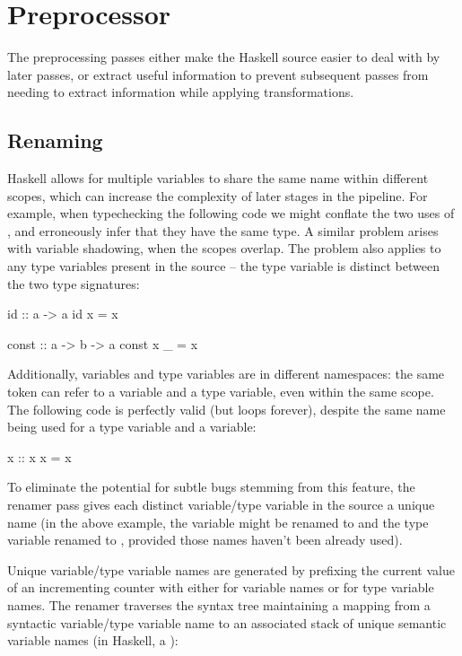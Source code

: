 \documentclass[dissertation.tex]{subfiles}
\begin{document}
\section{Preprocessor}
{

    The preprocessing passes either make the Haskell source easier to deal with by later passes, or extract useful information to prevent subsequent passes from needing to extract information while applying transformations.

    \subsection{Renaming}
    {

        Haskell allows for multiple variables to share the same name within different scopes, which can increase the complexity of later stages in the pipeline. For example, when typechecking the following code we might conflate the two uses of , and erroneously infer that they have the same type. A similar problem arises with variable shadowing, when the scopes overlap. The problem also applies to any type variables present in the source -- the type variable  is distinct between the two type signatures:

        \begin{haskellfigure}
        id :: a -> a
        id x = x

        const :: a -> b -> a
        const x _ = x
        \end{haskellfigure}

        Additionally, variables and type variables are in different namespaces: the same token can refer to a variable and a type variable, even within the same scope. The following code is perfectly valid (but loops forever), despite the same name being used for a type variable and a variable:

        \begin{haskellfigure}
        x :: x
        x = x
        \end{haskellfigure}

        To eliminate the potential for subtle bugs stemming from this feature, the renamer pass gives each distinct variable/type variable in the source a unique name (in the above example, the variable  might be renamed to  and the type variable renamed to , provided those names haven't been already used).
        
        Unique variable/type variable names are generated by prefixing the current value of an incrementing counter with either  for variable names or  for type variable names. The renamer traverses the syntax tree maintaining a mapping from a syntactic variable/type variable name to an associated stack of unique semantic variable names (in Haskell, a ):

}}
\end{document}
